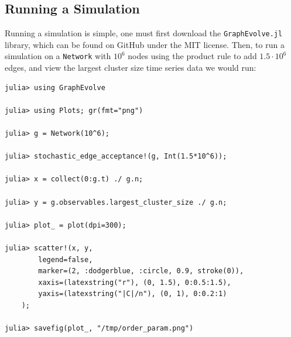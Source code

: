 \subsection{Running a Simulation}
Running a simulation is simple, one must first download the \texttt{GraphEvolve.jl} library, which can be found on GitHub under the MIT license.
Then, to run a simulation on a \texttt{Network} with $10^6$ nodes using the product rule to add $1.5 \cdot 10^6$ edges, and view the largest cluster size time series data we would run:

\begin{lstlisting}
julia> using GraphEvolve

julia> using Plots; gr(fmt="png")

julia> g = Network(10^6);

julia> stochastic_edge_acceptance!(g, Int(1.5*10^6));

julia> x = collect(0:g.t) ./ g.n;

julia> y = g.observables.largest_cluster_size ./ g.n;

julia> plot_ = plot(dpi=300);

julia> scatter!(x, y,
		legend=false,
		marker=(2, :dodgerblue, :circle, 0.9, stroke(0)),
		xaxis=(latexstring("r"), (0, 1.5), 0:0.5:1.5),
		yaxis=(latexstring("|C|/n"), (0, 1), 0:0.2:1)
	);

julia> savefig(plot_, "/tmp/order_param.png")
\end{lstlisting}
